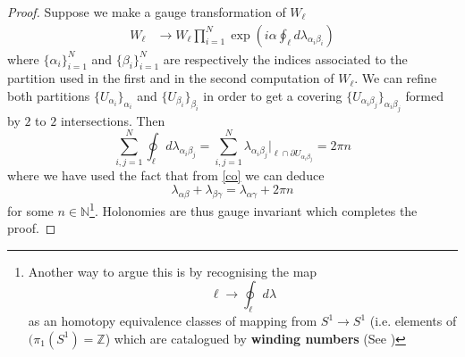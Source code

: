 \begin{proof}
Suppose we make a gauge transformation of $W_{\ell}$
\begin{equation}
\begin{aligned}
    W_{\ell} &\to W_{\ell} \prod_{i=1}^N \exp(i \alpha \oint_{\ell} d \lambda_{\alpha_i \beta_i})
    \end{aligned}
\end{equation}
where $\{\alpha_i\}_{i=1}^N$ and $\{\beta_i\}_{i=1}^N$ are respectively the indices associated to the partition used in the first and in the second computation of $W_{\ell}$. We can refine both partitions $\{U_{\alpha_i}\}_{\alpha_i}$ and $\{U_{\beta_i}\}_{\beta_i}$ in order to get a covering $\{U_{\alpha_i  \beta_j}\}_{\alpha_i \beta_j}$ formed by $2$ to $2$ intersections. Then
\begin{equation}
    \sum_{i,j=1}^N   \oint_{\ell} d \lambda_{\alpha_i \beta_j} = \sum_{i,j=1}^N \lambda_{\alpha_i \beta_j}|_{\ell \cap \partial U_{\alpha_i \beta_j}} = 2 \pi n
\end{equation}
where we have used the fact that from \eqref{co} we can deduce
\begin{equation}
    \lambda_{\alpha \beta} + \lambda_{\beta \gamma} = \lambda_{\alpha \gamma} + 2 \pi n
\end{equation}
for some $n \in \mathbb{N}$\footnote{Another way to argue this is by recognising the map
\begin{equation}
    \ell \to \oint_{\ell} d \lambda
\end{equation}
as an homotopy equivalence classes of mapping from $S^1 \to S^1$ (i.e. elements of $(\pi_1(S^1)= \mathbb{Z}$) which are catalogued by \textbf{winding numbers} (See \cite[Section 2.1.2]{percacci}) }. Holonomies are thus gauge invariant which completes the proof.  
\end{proof}
